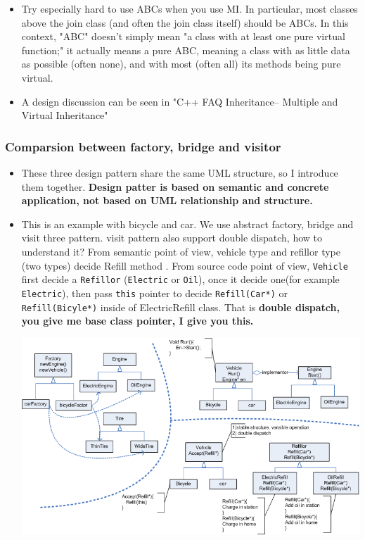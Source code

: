 \documentclass[a4paper,11pt,twoside]{book}
\begin{document}
\begin{itemize}
	
	\item Try especially hard to use ABCs when you use MI. In particular, most classes above the join class (and often the join class itself) should be ABCs. In this context, "ABC" doesn't simply mean "a class with at least one pure virtual function;" it actually means a pure ABC, meaning a class with as little data as possible (often none), and with most (often all) its methods being pure virtual.
	
    \item A design discussion can be seen in "C++ FAQ Inheritance-- Multiple and Virtual Inheritance"
	
\end{itemize}

\subsubsection{Comparsion between factory, bridge and visitor}

\begin{itemize}
	\item These three design pattern share the same UML structure, so I introduce them together. \textbf{Design patter is based on semantic and concrete application, not based on UML relationship and structure.}
	
	\item This is an example with bicycle and car.  We use abstract factory, bridge and visit three pattern. visit pattern also support double dispatch, how to understand it? From semantic point of view, vehicle type and refillor type (two types) decide Refill method . From source code point of view, \texttt{Vehicle} first decide a \texttt{Refillor} (\texttt{Electric} or \texttt{Oil}), once it decide one(for example \texttt{Electric}), then pass \texttt{this} pointer to decide \texttt{Refill(Car*)} or \texttt{Refill(Bicyle*)} inside of ElectricRefill class. That is \textbf{double dispatch, you give me base class pointer, I give you this.} 

		\centering
		\includegraphics[width=0.93\linewidth]{pics/visitor.png}
	    
\end{itemize}
\end{document}
